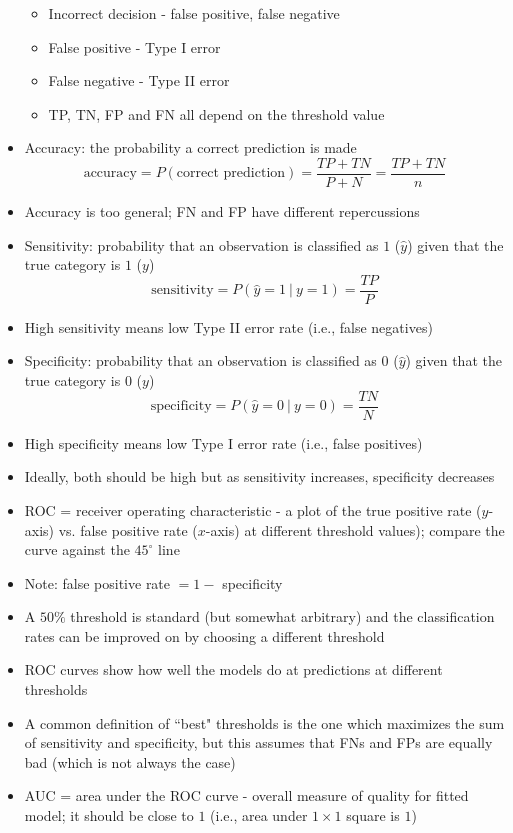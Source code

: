 \documentclass[12pt]{article}
\begin{document}
\begin{itemize}
\begin{itemize}
\item Incorrect decision - false positive, false negative 
\item False positive - Type I error 
\item False negative - Type II error 
\item TP, TN, FP and FN all depend on the threshold value \end{itemize} 
\item Accuracy: the probability a correct prediction is made $$ \text{accuracy} = P(\text{correct prediction}) = \frac{TP + TN}{P+N} = \frac{TP + TN}{n} $$
\item Accuracy is too general; FN and FP have different repercussions 
\item Sensitivity: probability that an observation is classified as $1$ ($\hat{y}$) given that the true category is $1$ ($y$)
$$ \text{sensitivity} = P(\hat{y} = 1 ~|~ y= 1) = \frac{TP}{P} $$ 
\item High sensitivity means low Type II error rate (i.e., false negatives) 
\item Specificity: probability that an observation is classified as $0$ ($\hat{y}$) given that the true category is $0$ ($y$)
$$ \text{specificity} = P(\hat{y} = 0 ~|~ y = 0) = \frac{TN}{N} $$ 
\item High specificity means low Type I error rate (i.e., false positives) 
\item Ideally, both should be high but as sensitivity increases, specificity decreases
\item ROC  = receiver operating characteristic - a plot of the true positive rate ($y$-axis) vs. false positive rate ($x$-axis) at different threshold values); compare the curve against the $45^\circ$ line
\item Note: false positive rate $= 1 - $ specificity 
\item A $50\%$ threshold is standard (but somewhat arbitrary) and the classification rates can be improved on by choosing a different threshold 
\item ROC curves show how well the models do at predictions at different thresholds 
\item A common definition of ``best" thresholds is the one which maximizes the sum of sensitivity and specificity, but this assumes that FNs and FPs are equally bad (which is not always the case) 
\item AUC = area under the ROC curve - overall measure of quality for fitted model; it should be close to $1$ (i.e., area under $1 \times 1$ square is $1$) 

\end{itemize}
\end{document}
